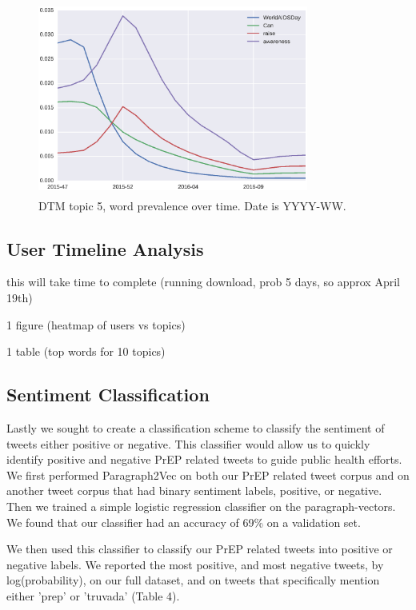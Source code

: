 \documentclass{sig-alternate-05-2015}
\begin{document}
\begin{figure}
\centering
\includegraphics[height=2.5in, width=3.5in]{DTMfig2}
\caption{DTM topic 5, word prevalence over time. Date is YYYY-WW.}
\end{figure}

\subsection{User Timeline Analysis}

 this will take time to complete (running download, prob 5 days, so approx April 19th)

1 figure (heatmap of users vs topics)

1 table (top words for 10 topics)

\subsection{Sentiment Classification}


Lastly we sought to create a classification scheme to classify the sentiment of tweets either positive or negative. This classifier would allow us to quickly identify positive and negative PrEP related tweets to guide public health efforts. We first performed Paragraph2Vec on both our PrEP related tweet corpus and on another tweet corpus that had binary sentiment labels, positive, or negative. Then we trained a simple logistic regression classifier on the paragraph-vectors. We found that our classifier had an accuracy of 69\% on a validation set.

We then used this classifier to classify our PrEP related tweets into positive or negative labels. We reported the most positive, and most negative tweets, by log(probability), on our full dataset, and on tweets that specifically mention either 'prep' or 'truvada' (Table 4).
\end{document}
